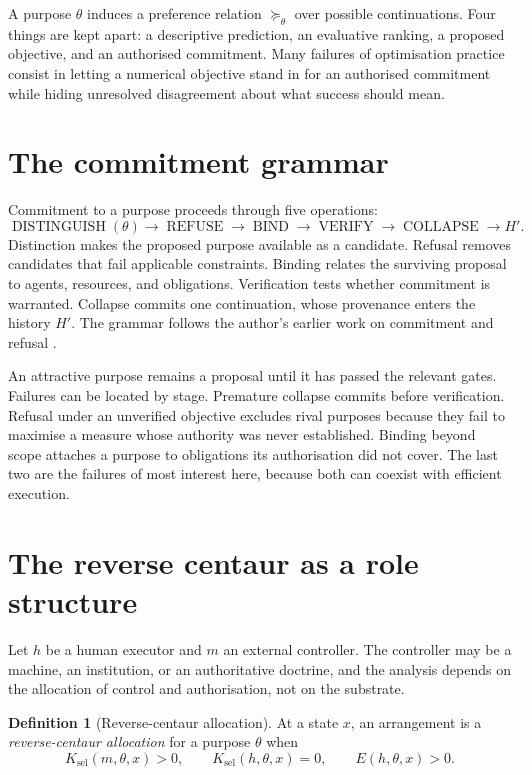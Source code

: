 \documentclass[11pt]{article}
\theoremstyle{definition}
\newtheorem{definition}{Definition}
\theoremstyle{remark}
\begin{document}
A purpose $\theta$ induces a preference relation $\succeq_\theta$ over possible continuations. Four things are kept apart: a descriptive prediction, an evaluative ranking, a proposed objective, and an authorised commitment. Many failures of optimisation practice consist in letting a numerical objective stand in for an authorised commitment while hiding unresolved disagreement about what success should mean.

\section{The commitment grammar}

Commitment to a purpose proceeds through five operations:
\[
\operatorname{DISTINGUISH}(\theta)\to\operatorname{REFUSE}\to\operatorname{BIND}\to\operatorname{VERIFY}\to\operatorname{COLLAPSE}\to H'.
\]
Distinction makes the proposed purpose available as a candidate. Refusal removes candidates that fail applicable constraints. Binding relates the surviving proposal to agents, resources, and obligations. Verification tests whether commitment is warranted. Collapse commits one continuation, whose provenance enters the history $H'$. The grammar follows the author's earlier work on commitment and refusal \cite{flyxionCalculus}.

An attractive purpose remains a proposal until it has passed the relevant gates. Failures can be located by stage. Premature collapse commits before verification. Refusal under an unverified objective excludes rival purposes because they fail to maximise a measure whose authority was never established. Binding beyond scope attaches a purpose to obligations its authorisation did not cover. The last two are the failures of most interest here, because both can coexist with efficient execution.

\section{The reverse centaur as a role structure}

Let $h$ be a human executor and $m$ an external controller. The controller may be a machine, an institution, or an authoritative doctrine, and the analysis depends on the allocation of control and authorisation, not on the substrate.

\begin{definition}[Reverse-centaur allocation]
At a state $x$, an arrangement is a \emph{reverse-centaur allocation} for a purpose $\theta$ when
\[
K_{\mathrm{sel}}(m,\theta,x)>0,\qquad K_{\mathrm{sel}}(h,\theta,x)=0,\qquad E(h,\theta,x)>0.
\]
\end{definition}
\end{document}

